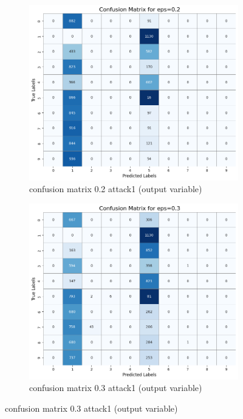 \documentclass[11pt,onside]{article}
\begin{document}
\begin{figure}[h]
  \centering
  \begin{subfigure}[b]{0.49\textwidth}
    \centering
    \includegraphics[width=\textwidth]{V2_images/target_confusion_matrix_eps_0.2_attack_1.png}
    \caption{confusion matrix 0.2 attack1 (output variable)}
    \label{fig:image1}
  \end{subfigure}
  \hfill
  \begin{subfigure}[b]{0.49\textwidth}
    \centering
    \includegraphics[width=\textwidth]{V2_images/target_confusion_matrix_eps_0.3_attack_1.png}
    \caption{confusion matrix 0.3 attack1 (output variable)}
    \label{fig:image2}
  \end{subfigure}

\end{figure}
\end{document}
